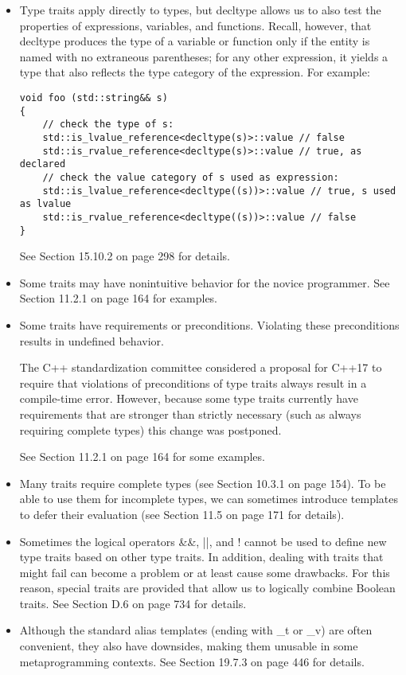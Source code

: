 \begin{itemize}
\item 
Type traits apply directly to types, but decltype allows us to also test the properties of expressions, variables, and functions. Recall, however, that decltype produces the type of a variable or function only if the entity is named with no extraneous parentheses; for any other expression, it yields a type that also reflects the type category of the expression. For example:

\begin{lstlisting}[style=styleCXX]
void foo (std::string&& s)
{
	// check the type of s:
	std::is_lvalue_reference<decltype(s)>::value // false
	std::is_rvalue_reference<decltype(s)>::value // true, as declared
	// check the value category of s used as expression:
	std::is_lvalue_reference<decltype((s))>::value // true, s used as lvalue
	std::is_rvalue_reference<decltype((s))>::value // false
}
\end{lstlisting}

See Section 15.10.2 on page 298 for details.

\item 
Some traits may have nonintuitive behavior for the novice programmer. See Section 11.2.1 on page 164 for examples.

\item 
Some traits have requirements or preconditions. Violating these preconditions results in undefined behavior.

\begin{tcolorbox}[colback=webgreen!5!white,colframe=webgreen!75!black]
\hspace*{0.75cm}The C++ standardization committee considered a proposal for C++17 to require that violations of preconditions of type traits always result in a compile-time error. However, because some type traits currently have requirements that are stronger than strictly necessary (such as always requiring complete types) this change was postponed.
\end{tcolorbox}

See Section 11.2.1 on page 164 for some examples.

\item 
Many traits require complete types (see Section 10.3.1 on page 154). To be able to use them for incomplete types, we can sometimes introduce templates to defer their evaluation (see Section 11.5 on page 171 for details).

\item 
Sometimes the logical operators \&\&, ||, and ! cannot be used to define new type traits based on other type traits. In addition, dealing with traits that might fail can become a problem or at least cause some drawbacks. For this reason, special traits are provided that allow us to logically combine Boolean traits. See Section D.6 on page 734 for details.

\item 
Although the standard alias templates (ending with \_t or \_v) are often convenient, they also have downsides, making them unusable in some metaprogramming contexts. See Section 19.7.3 on page 446 for details.
\end{itemize}



